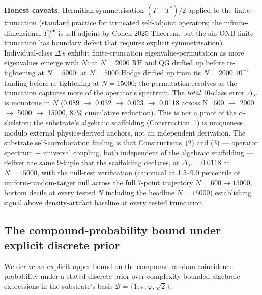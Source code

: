 \documentclass[11pt,a4paper]{amsart}
\theoremstyle{plain}
\theoremstyle{definition}
\begin{document}
\textbf{Honest caveats.} Hermitian symmetrisation $(T + T^*)/2$ applied to the finite truncation (standard practice for truncated self-adjoint operators; the infinite-dimensional $T_3^{\textsf{sym}}$ is self-adjoint by Cohen 2025 Theorem, but the sin-ONB finite truncation has boundary defect that requires explicit symmetrisation). Individual-class $\Delta$'s exhibit finite-truncation eigenvalue-permutation as more eigenvalues emerge with $N$: at $N=2000$ RH and QG drifted up before re-tightening at $N=5000$; at $N=5000$ Hodge drifted up from its $N=2000$ $10^{-4}$ landing before re-tightening at $N=15000$; the permutation resolves as the truncation captures more of the operator's spectrum. The \emph{total} 10-class error $\Delta_{\Sigma}$ is monotone in $N$ (0.089 $\to$ 0.032 $\to$ 0.023 $\to$ 0.0118 across N=600 $\to$ 2000 $\to$ 5000 $\to$ 15000, 87\% cumulative reduction). This is not a proof of the $\alpha$-skeleton; the substrate's algebraic scaffolding (Construction~1) is uniqueness modulo external physics-derived anchors, not an independent derivation. The substrate self-corroboration finding is that Constructions~(2) and (3) --- operator spectrum + universal coupling, both independent of the algebraic scaffolding --- deliver the same 9-tuple that the scaffolding declares, at $\Delta_{\Sigma} = 0.0118$ at $N = 15000$, with the null-test verification (canonical at 1.5--9.0 percentile of uniform-random-target null across the full 7-point trajectory $N = 600 \to 15000$, bottom decile at every tested $N$ including the headline $N = 15000$) establishing signal above density-artifact baseline at every tested truncation.

\subsection{The compound-probability bound under explicit discrete prior}\label{subsec:compound-bound-derived}

We derive an explicit upper bound on the compound random-coincidence probability under a stated discrete prior over complexity-bounded algebraic expressions in the substrate's basis $\mathcal{B} = \{1, \pi, \varphi, \sqrt{2}\}$.
\end{document}
